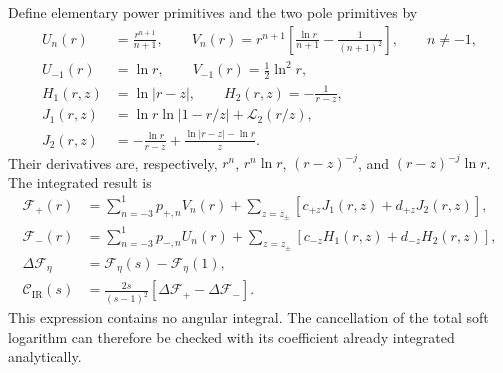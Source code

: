 Define elementary power primitives and the two pole primitives by
\begin{align}
 U_n(r)&=\frac{r^{n+1}}{n+1},\qquad
 V_n(r)=r^{n+1}\left[\frac{\ln r}{n+1}-\frac1{(n+1)^2}\right],
 \qquad n\ne-1,\\
 U_{-1}(r)&=\ln r,\qquad V_{-1}(r)=\frac12\ln^2r,\\
 H_1(r,z)&=\ln|r-z|,\qquad H_2(r,z)=-\frac1{r-z},\\
 J_1(r,z)&=\ln r\ln|1-r/z|+\mathcal L_2(r/z),\\
 J_2(r,z)&=-\frac{\ln r}{r-z}
 +\frac{\ln|r-z|-\ln r}{z}.
\end{align}
Their derivatives are, respectively, $r^n$, $r^n\ln r$,
$(r-z)^{-j}$, and $(r-z)^{-j}\ln r$. The integrated result is
\begin{align}
 \mathcal F_+(r)&=\sum_{n=-3}^1p_{+,n}V_n(r)
 +\sum_{z=z_\pm}[c_{+z}J_1(r,z)+d_{+z}J_2(r,z)],\\
 \mathcal F_-(r)&=\sum_{n=-3}^1p_{-,n}U_n(r)
 +\sum_{z=z_\pm}[c_{-z}H_1(r,z)+d_{-z}H_2(r,z)],\\
 \Delta\mathcal F_\eta&=\mathcal F_\eta(s)-\mathcal F_\eta(1),\\
 \mathcal C_{\mathrm{IR}}(s)&=\boxed{\frac{2s}{(s-1)^2}
 [\Delta\mathcal F_+-\Delta\mathcal F_-].}
 \label{eq:comp-soft-integrated-ir}
\end{align}
This expression contains no angular integral. The cancellation of the total soft logarithm can therefore be checked
with its coefficient already integrated analytically.

